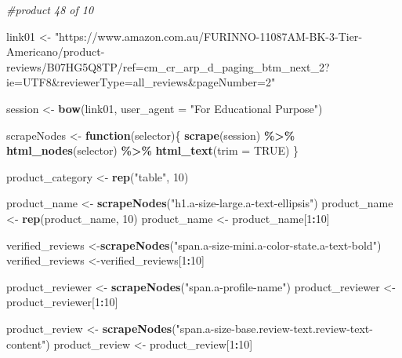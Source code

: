 \documentclass[
]{article}
\newenvironment{Shaded}{\begin{snugshade}}{\end{snugshade}}
\newcommand{\AttributeTok}[1]{\textcolor[rgb]{0.13,0.29,0.53}{#1}}
\newcommand{\CommentTok}[1]{\textcolor[rgb]{0.56,0.35,0.01}{\textit{#1}}}
\newcommand{\ConstantTok}[1]{\textcolor[rgb]{0.56,0.35,0.01}{#1}}
\newcommand{\ControlFlowTok}[1]{\textcolor[rgb]{0.13,0.29,0.53}{\textbf{#1}}}
\newcommand{\DecValTok}[1]{\textcolor[rgb]{0.00,0.00,0.81}{#1}}
\newcommand{\FunctionTok}[1]{\textcolor[rgb]{0.13,0.29,0.53}{\textbf{#1}}}
\newcommand{\NormalTok}[1]{#1}
\newcommand{\OtherTok}[1]{\textcolor[rgb]{0.56,0.35,0.01}{#1}}
\newcommand{\SpecialCharTok}[1]{\textcolor[rgb]{0.81,0.36,0.00}{\textbf{#1}}}
\newcommand{\StringTok}[1]{\textcolor[rgb]{0.31,0.60,0.02}{#1}}
\begin{document}
\begin{Shaded}
\begin{Highlighting}[]
\CommentTok{\#product 48 of 10}

\NormalTok{link01 }\OtherTok{\textless{}{-}} \StringTok{"https://www.amazon.com.au/FURINNO{-}11087AM{-}BK{-}3{-}Tier{-}Americano/product{-}reviews/B07HG5Q8TP/ref=cm\_cr\_arp\_d\_paging\_btm\_next\_2?ie=UTF8\&reviewerType=all\_reviews\&pageNumber=2"}


\NormalTok{  session }\OtherTok{\textless{}{-}} \FunctionTok{bow}\NormalTok{(link01,}
               \AttributeTok{user\_agent =} \StringTok{"For Educational Purpose"}\NormalTok{)}

\NormalTok{  scrapeNodes }\OtherTok{\textless{}{-}} \ControlFlowTok{function}\NormalTok{(selector)\{}
    \FunctionTok{scrape}\NormalTok{(session) }\SpecialCharTok{\%\textgreater{}\%}
      \FunctionTok{html\_nodes}\NormalTok{(selector) }\SpecialCharTok{\%\textgreater{}\%}
      \FunctionTok{html\_text}\NormalTok{(}\AttributeTok{trim =} \ConstantTok{TRUE}\NormalTok{)}
\NormalTok{  \}}

\NormalTok{  product\_category }\OtherTok{\textless{}{-}} \FunctionTok{rep}\NormalTok{(}\StringTok{"table"}\NormalTok{, }\DecValTok{10}\NormalTok{)}

\NormalTok{  product\_name }\OtherTok{\textless{}{-}} \FunctionTok{scrapeNodes}\NormalTok{(}\StringTok{"h1.a{-}size{-}large.a{-}text{-}ellipsis"}\NormalTok{)}
\NormalTok{  product\_name }\OtherTok{\textless{}{-}} \FunctionTok{rep}\NormalTok{(product\_name, }\DecValTok{10}\NormalTok{)}
\NormalTok{  product\_name }\OtherTok{\textless{}{-}}\NormalTok{ product\_name[}\DecValTok{1}\SpecialCharTok{:}\DecValTok{10}\NormalTok{]}
  
\NormalTok{  verified\_reviews }\OtherTok{\textless{}{-}}\FunctionTok{scrapeNodes}\NormalTok{(}\StringTok{"span.a{-}size{-}mini.a{-}color{-}state.a{-}text{-}bold"}\NormalTok{)}
\NormalTok{  verified\_reviews }\OtherTok{\textless{}{-}}\NormalTok{verified\_reviews[}\DecValTok{1}\SpecialCharTok{:}\DecValTok{10}\NormalTok{]}
  
\NormalTok{  product\_reviewer }\OtherTok{\textless{}{-}} \FunctionTok{scrapeNodes}\NormalTok{(}\StringTok{"span.a{-}profile{-}name"}\NormalTok{)}
\NormalTok{  product\_reviewer }\OtherTok{\textless{}{-}}\NormalTok{ product\_reviewer[}\DecValTok{1}\SpecialCharTok{:}\DecValTok{10}\NormalTok{]}
  
\NormalTok{  product\_review }\OtherTok{\textless{}{-}} \FunctionTok{scrapeNodes}\NormalTok{(}\StringTok{"span.a{-}size{-}base.review{-}text.review{-}text{-}content"}\NormalTok{)}
\NormalTok{  product\_review }\OtherTok{\textless{}{-}}\NormalTok{ product\_review[}\DecValTok{1}\SpecialCharTok{:}\DecValTok{10}\NormalTok{]}
  

\end{Highlighting}
\end{Shaded}
\end{document}
